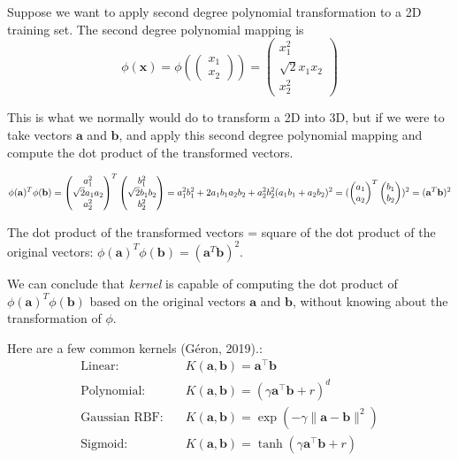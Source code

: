 \documentclass[
  letterpaper,
  DIV=11,
  numbers=noendperiod]{scrartcl}
\begin{document}
Suppose we want to apply second degree polynomial transformation to a 2D
training set. The second degree polynomial mapping is \[
\phi(\mathbf{x}) = \phi\left(\begin{pmatrix} x_1 \\ x_2 \end{pmatrix}\right) = \begin{pmatrix} x_1^2 \\ \sqrt{2} x_1 x_2 \\ x_2^2 \end{pmatrix}
\]

This is what we normally would do to transform a 2D into 3D, but if we
were to take vectors \(\mathbf{a}\) and \(\mathbf{b}\), and apply this
second degree polynomial mapping and compute the dot product of the
transformed vectors.

\[
\phi(\mathbf{a})^T \phi(\mathbf{b}) = \begin{pmatrix} a_1^2 \\ \sqrt{2} a_1 a_2 \\ a_2^2 \end{pmatrix}^T \begin{pmatrix} b_1^2 \\ \sqrt{2} b_1 b_2 \\ b_2^2 \end{pmatrix} = a_1^2b_1^2 + 2a_1b_1a_2b_2 + a_2^2b_2^2 \\
(a_1b_1 + a_2b_2)^2 = (\begin{pmatrix} a_1 \\ a_2 \end{pmatrix}^T\begin{pmatrix} b_1 \\ b_2 \end{pmatrix})^2 = (\mathbf{a}^T\mathbf{b})^2
\]

The dot product of the transformed vectors = square of the dot product
of the original vectors:
\(\phi(\mathbf{a})^T \phi(\mathbf{b}) = (\mathbf{a}^T\mathbf{b})^2\).

We can conclude that \emph{kernel} is capable of computing the dot
product of \(\phi(\mathbf{a})^T \phi(\mathbf{b})\) based on the original
vectors \(\mathbf{a}\) and \(\mathbf{b}\), without knowing about the
transformation of \(\phi\).

Here are a few common kernels (Géron, 2019).: \[
\begin{align*}
\text{Linear:} \quad & K(\mathbf{a}, \mathbf{b}) = \mathbf{a}^\top \mathbf{b} \\
\text{Polynomial:} \quad & K(\mathbf{a}, \mathbf{b}) = (\gamma \mathbf{a}^\top \mathbf{b} + r)^d \\
\text{Gaussian RBF:} \quad & K(\mathbf{a}, \mathbf{b}) = \exp\left(-\gamma \|\mathbf{a} - \mathbf{b}\|^2\right) \\
\text{Sigmoid:} \quad & K(\mathbf{a}, \mathbf{b}) = \tanh(\gamma \mathbf{a}^\top \mathbf{b} + r)
\end{align*}
\]
\end{document}
